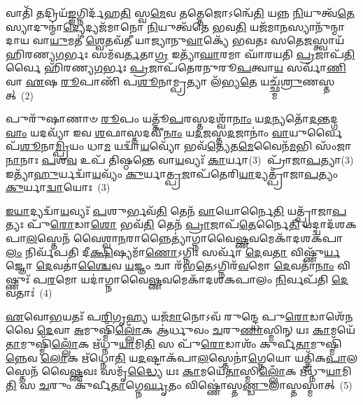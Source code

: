 𑌵𑌾𑌤𑌿᳴ \ul{𑌤}\-𑌦𑍍𑌰𑌿𑌯᳴\-\ul{𑌙𑍍𑌙}\-𑌗𑍍𑌨𑌿𑌰𑍍𑌦᳴𑌹\-\ul{𑌤𑌿} 𑌸𑍍𑌵\-\ul{𑌮𑍇}\-𑌵 𑌤𑌤𑍍𑌤𑍇𑌜𑍋\-𑌽𑌨𑍍𑌵𑍇᳴\-\ul{𑌤𑌿} 𑌯𑌨𑍍𑌨 \ul{𑌨𑌿}\-𑌯𑍁𑌤𑍍𑌵᳴\-\ul{𑌤𑍇} 𑌸𑍍𑌯𑌾𑌦𑍁𑌨𑍍𑌮𑌾॑\-\ul{𑌦𑍍𑌯𑍇}\-𑌦𑍍𑌯𑌜᳴𑌮𑌾𑌨𑍋 \ul{𑌨𑌿}\-𑌯𑍁𑌤𑍍𑌵᳴𑌤𑍇 𑌭𑌵\-\ul{𑌤𑌿} 𑌯𑌜᳴𑌮𑌾\-\ul{𑌨}\-𑌸𑍍𑌯𑌾𑌨𑍁᳴𑌨𑍍𑌮𑌾𑌦𑌾𑌯 𑌵𑌾\-\ul{𑌯𑍁}\-𑌮𑌤𑍀॑ \ul{𑌶𑍍𑌵𑍇}\-𑌤𑌵᳴𑌤𑍀 𑌯𑌾𑌜𑍍𑌯𑌾𑌨𑍁\-\ul{𑌵𑌾}\-𑌕𑍍𑌯𑍇᳴ 𑌭𑌵𑌤𑌃 𑌸𑌤𑍇\-\ul{𑌜}\-𑌸𑍍𑌤𑍍𑌵𑌾𑌯᳴ 𑌹𑌿𑌰𑌣𑍍𑌯\-\ul{𑌗}\-𑌰𑍍𑌭𑌃 𑌸𑌮᳴𑌵\-\ul{𑌰𑍍𑌤}\-𑌤𑌾\-\ul{𑌗𑍍𑌰} 𑌇𑌤𑍍𑌯𑌾᳴\-\ul{𑌘𑌾}\-𑌰𑌮𑌾 𑌘𑌾᳴𑌰𑌯𑌤𑌿 \ul{𑌪𑍍𑌰}\-𑌜𑌾𑌪᳴\-\ul{𑌤𑌿}\-𑌰𑍍𑌵𑍈 𑌹𑌿᳴𑌰𑌣𑍍𑌯\-\ul{𑌗}\-𑌰𑍍𑌭𑌃 \ul{𑌪𑍍𑌰}\-𑌜𑌾𑌪᳴𑌤𑍇𑌰𑌨𑍁𑌰𑍂\-\ul{𑌪}\-𑌤𑍍𑌵𑌾\-\ul{𑌯} 𑌸𑌰𑍍𑌵𑌾᳴\-\ul{𑌣𑌿} 𑌵𑌾 \ul{𑌏}\-𑌷 \ul{𑌰𑍂}\-𑌪𑌾𑌣𑌿᳴ 𑌪\-\ul{𑌶𑍂}\-𑌨𑌾𑌮𑍍𑌪𑍍𑌰𑌤𑍍𑌯𑌾 𑌲᳴𑌭𑍍𑌯\-\ul{𑌤𑍇} 𑌯𑌚𑍍𑌛𑍍𑌮᳴\-\ul{𑌶𑍍𑌰𑍁}\-𑌣𑌸𑍍𑌤𑌤𑍍~(2)

𑌪𑍁𑌰𑍁᳴𑌷𑌾𑌣𑌾𑍞 \ul{𑌰𑍂}\-𑌪𑌂 𑌯𑌤𑍍𑌤𑍂᳴\-\ul{𑌪}\-𑌰𑌸𑍍𑌤𑌦𑌶𑍍𑌵𑌾᳴\-\ul{𑌨𑌾𑌂} 𑌯\-\ul{𑌦}\-𑌨𑍍𑌯𑌤𑍋᳴\-\ul{𑌦}\-𑌨𑍍𑌤𑌦𑍍𑌗\-\ul{𑌵𑌾𑌂} 𑌯𑌦𑌵𑍍𑌯𑌾᳴ 𑌇𑌵 \ul{𑌶}\-𑌫𑌾𑌸𑍍𑌤𑌦𑌵𑍀᳴\-\ul{𑌨𑌾𑌂} 𑌯\-\ul{𑌦}\-𑌜𑌸𑍍𑌤\-\ul{𑌦}\-𑌜𑌾𑌨𑌾𑌂॑ \ul{𑌵𑌾}\-𑌯𑍁𑌰𑍍𑌵𑍈 𑌪᳴\-\ul{𑌶𑍂}\-𑌨𑌾\-\ul{𑌮𑍍𑌪𑍍𑌰𑌿}\-𑌯𑌂 𑌧𑌾\-\ul{𑌮} 𑌯𑌦𑍍𑌵𑌾᳴\-\ul{𑌯}\-𑌵𑍍𑌯𑍋᳴ 𑌭𑌵᳴\-\ul{𑌤𑍍𑌯𑍇}\-𑌤\-\ul{𑌮𑍇}\-𑌵𑍈𑌨᳴\-\ul{𑌮}\-𑌭𑌿 𑌸𑌂᳴𑌜𑌾\-\ul{𑌨𑌾}\-𑌨𑌾𑌃 \ul{𑌪}\-𑌶\-\ul{𑌵} 𑌉𑌪᳴ 𑌤𑌿𑌷𑍍𑌠𑌨𑍍𑌤𑍇 𑌵𑌾\-\ul{𑌯}\-𑌵𑍍𑌯𑌃᳴ \ul{𑌕𑌾}\-𑌰𑍍𑌯𑌾(3)𑌃 𑌪𑍍𑌰𑌾᳴𑌜𑌾\-\ul{𑌪}\-𑌤𑍍𑌯𑌾(3) 𑌇𑌤𑍍𑌯𑌾᳴\-\ul{𑌹𑍁}\-𑌰𑍍𑌯𑌦𑍍𑌵𑌾᳴\-\ul{𑌯}\-𑌵𑍍𑌯𑌂᳴ \ul{𑌕𑍁}\-𑌰𑍍𑌯𑌾\-\ul{𑌤𑍍𑌪𑍍𑌰}\-𑌜𑌾𑌪᳴𑌤𑍇𑌰𑌿\-\ul{𑌯𑌾}\-𑌦𑍍𑌯𑌤𑍍𑌪𑍍𑌰𑌾᳴𑌜𑌾\-\ul{𑌪}\-𑌤𑍍𑌯𑌂 \ul{𑌕𑍁}\-𑌰𑍍𑌯𑌾\-\ul{𑌦𑍍𑌵𑌾}\-𑌯𑍋𑌃~(3)

\-\ul{𑌇}\-\-\ul{𑌯𑌾}\-𑌦𑍍𑌯𑌦𑍍𑌵𑌾᳴\-\ul{𑌯}\-𑌵𑍍𑌯𑌃᳴ \ul{𑌪}\-𑌶𑍁𑌰𑍍𑌭𑌵᳴\-\ul{𑌤𑌿} 𑌤𑍇𑌨᳴ \ul{𑌵𑌾}\-𑌯𑍋𑌰𑍍𑌨𑍈\-\ul{𑌤𑌿} 𑌯𑌤𑍍𑌪𑍍𑌰𑌾᳴𑌜𑌾\-\ul{𑌪}\-𑌤𑍍𑌯𑌃 𑌪𑍁᳴\-\ul{𑌰𑍋}\-𑌡𑌾\-\ul{𑌶𑍋} 𑌭𑌵᳴\-\ul{𑌤𑌿} 𑌤𑍇𑌨᳴ \ul{𑌪𑍍𑌰𑌾}\-𑌜𑌾𑌪᳴\-\ul{𑌤𑍇}\-𑌰𑍍𑌨𑍈\-\ul{𑌤𑌿} 𑌯𑌦𑍍𑌦𑍍𑌵𑌾𑌦᳴𑌶\-𑌕𑌪𑌾\-\ul{𑌲}\-𑌸𑍍𑌤𑍇𑌨᳴ 𑌵𑍈𑌶𑍍𑌵𑌾\-\ul{𑌨}\-𑌰𑌾𑌨𑍍𑌨𑍈𑌤𑍍𑌯𑌾॑𑌗𑍍𑌨𑌾𑌵𑍈\-\ul{𑌷𑍍𑌣}\-𑌵𑌮𑍇𑌕𑌾᳴\-𑌦𑌶\-𑌕𑌪𑌾\-\ul{𑌲𑌂} 𑌨𑌿𑌰𑍍𑌵᳴𑌪𑌤𑌿 𑌦𑍀\-\ul{𑌕𑍍𑌷𑌿}\-𑌷𑍍𑌯𑌮𑌾᳴\-\ul{𑌣𑍋}\-\-𑌽𑌗𑍍𑌨𑌿𑌃 𑌸𑌰𑍍𑌵𑌾᳴ \ul{𑌦𑍇}\-𑌵\-\ul{𑌤𑌾} 𑌵𑌿𑌷𑍍𑌣𑍁᳴\-\ul{𑌰𑍍𑌯}\-𑌜𑍍𑌞𑍋 \ul{𑌦𑍇}\-𑌵𑌤𑌾॑\-\ul{𑌶𑍍𑌚𑍈}\-𑌵 \ul{𑌯}\-𑌜𑍍𑌞𑌂 𑌚𑌾 𑌰᳴𑌭\-\ul{𑌤𑍇}\-\-𑌽𑌗𑍍𑌨𑌿𑌰᳴\-\ul{𑌵}\-𑌮𑍋 \ul{𑌦𑍇}\-𑌵𑌤𑌾᳴\-\ul{𑌨𑌾𑌂} 𑌵𑌿𑌷𑍍𑌣𑍁𑌃᳴ 𑌪\-\ul{𑌰}\-𑌮𑍋 𑌯𑌦𑌾॑𑌗𑍍𑌨𑌾𑌵𑍈\-\ul{𑌷𑍍𑌣}\-𑌵𑌮𑍇𑌕𑌾᳴\-𑌦𑌶\-𑌕𑌪𑌾𑌲𑌂 \ul{𑌨𑌿}\-𑌰𑍍𑌵𑌪᳴𑌤𑌿 \ul{𑌦𑍇}\-𑌵𑌤𑌾𑌃॑~(4)

\-\ul{𑌏}\-𑌵𑍋\-\ul{𑌭}\-𑌯𑌤𑌃᳴ 𑌪\-\ul{𑌰𑌿}\-𑌗𑍃\-\ul{𑌹𑍍𑌯} 𑌯𑌜᳴\-\ul{𑌮𑌾}\-𑌨𑍋\-𑌽𑌵᳴ 𑌰𑍁𑌨𑍍𑌦𑍍𑌧𑍇 𑌪𑍁\-\ul{𑌰𑍋}\-𑌡𑌾𑌶𑍇᳴\-\ul{𑌨} 𑌵𑍈 \ul{𑌦𑍇}\-𑌵𑌾 \ul{𑌅}\-𑌮𑍁𑌷𑍍𑌮𑌿᳴\-\ul{𑌲𑍍𑌲𑍋𑌁}\-𑌕 𑌆॑𑌰𑍍𑌧𑍁𑌵𑌂 \ul{𑌚}\-𑌰𑍁\-\ul{𑌣𑌾}\-𑌸𑍍𑌮𑌿𑌨𑍍 𑌯𑌃 \ul{𑌕𑌾}\-𑌮𑌯𑍇᳴\-\ul{𑌤𑌾}\-𑌮𑍁𑌷𑍍𑌮𑌿᳴\-\ul{𑌲𑍍𑌲𑍋𑌁}\-𑌕 𑌋᳴𑌧𑍍𑌨𑍁\-\ul{𑌯𑌾}\-𑌮𑌿\-\ul{𑌤𑌿} 𑌸 𑌪𑍁᳴\-\ul{𑌰𑍋}\-𑌡𑌾𑌶𑌂᳴ 𑌕𑍁𑌰𑍍𑌵𑍀\-\ul{𑌤𑌾}\-𑌮𑍁𑌷𑍍𑌮𑌿᳴\-\ul{𑌨𑍍𑌨𑍇}\-𑌵 \ul{𑌲𑍋}\-𑌕 𑌋᳴𑌧𑍍𑌨𑍋\-\ul{𑌤𑌿} 𑌯\-\ul{𑌦}\-𑌷𑍍𑌟𑌾𑌕᳴𑌪𑌾\-\ul{𑌲}\-𑌸𑍍𑌤𑍇𑌨𑌾॑\-\ul{𑌗𑍍𑌨𑍇}\-𑌯𑍋 𑌯𑌤𑍍𑌤𑍍𑌰𑌿᳴𑌕\-\ul{𑌪𑌾}\-𑌲𑌸𑍍𑌤𑍇𑌨᳴ 𑌵𑍈\-\ul{𑌷𑍍𑌣}\-𑌵𑌃 𑌸𑌮𑍃᳴\-\ul{𑌦𑍍𑌧𑍍𑌯𑍈} 𑌯𑌃 \ul{𑌕𑌾}\-𑌮𑌯𑍇᳴\-\ul{𑌤𑌾}\-𑌸𑍍𑌮𑌿\-\ul{𑌲𑍍𑌲𑍋𑌁}\-𑌕 𑌋᳴𑌧𑍍𑌨𑍁\-\ul{𑌯𑌾}\-𑌮𑌿\-\ul{𑌤𑌿} 𑌸 \ul{𑌚}\-𑌰𑍁𑌂 𑌕𑍁᳴𑌰𑍍𑌵𑍀\-\ul{𑌤𑌾}\-𑌗𑍍𑌨𑍇\-\ul{𑌰𑍍𑌘𑍃}\-𑌤𑌂 𑌵𑌿𑌷𑍍𑌣𑍋॑𑌸𑍍𑌤\-\ul{𑌣𑍍𑌡𑍁}\-𑌲𑌾𑌸𑍍𑌤𑌸𑍍𑌮𑌾॑𑌤𑍍~(5)

